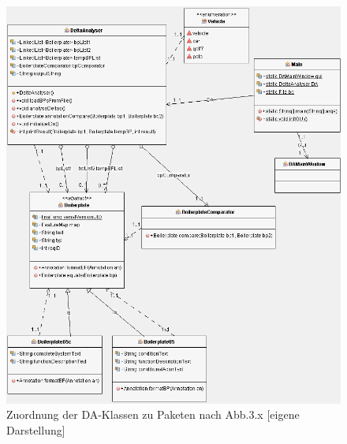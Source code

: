 \documentclass[12pt]{report}
\begin{document}
\begin{figure}[h!]
\begin{center}
\includegraphics[scale=0.635]{Bilder/da-klassen.png}
\caption{Zuordnung der DA-Klassen zu Paketen nach Abb.3.x [eigene Darstellung]}
\end{center}
\end{figure}
\end{document}
